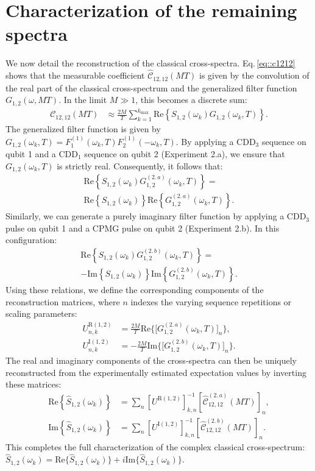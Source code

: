 \documentclass[%
 reprint,
superscriptaddress,
 amsmath,amssymb,
 aps,
pra,
]{revtex4-2}
\begin{document}
\section{Characterization of the remaining spectra}
\label{app::char}
We now detail the reconstruction of the classical cross-spectra. Eq.\,\eqref{eq::c1212} shows that the measurable coefficient $\hat{\mathcal{C}}_{12,12}(MT)$ is given by the convolution of the real part of the classical cross-spectrum and the generalized filter function $G_{1,2}(\omega, MT)$. In the limit $M\gg 1$, this becomes a discrete sum:
\begin{align}
    \mathcal{C}_{12,12}(MT)&\approx\frac{2M}{T}\sum_{k=1}^{k_{\max}}\text{Re}\left\{S_{1,2}(\omega_k)G_{1,2}(\omega_k, T)\right\}.
\end{align}
The generalized filter function is given by $G_{1,2}(\omega_k, T)=F_1^{(1)}(\omega_k, T)F_2^{(1)}(-\omega_k, T)$. By applying a $\text{CDD}_3$ sequence on qubit 1 and a $\text{CDD}_1$ sequence on qubit 2 (Experiment 2.a), we ensure that $G_{1,2}(\omega_k, T)$ is strictly real. Consequently, it follows that:
\begin{multline}
    \text{Re}\left\{S_{1,2}(\omega_k)G_{1,2}^{(2.\,a)}(\omega_k, T)\right\} = \\
    \text{Re}\left\{S_{1,2}(\omega_k)\right\}\text{Re}\left\{G_{1,2}^{(2.\,a)}(\omega_k, T)\right\}.
\end{multline}
Similarly, we can generate a purely imaginary filter function by applying a $\text{CDD}_3$ pulse on qubit 1 and a CPMG pulse on qubit 2 (Experiment 2.b). In this configuration:
\begin{multline}
    \text{Re}\left\{S_{1,2}(\omega_k)G_{1,2}^{(2.\,b)}(\omega_k, T)\right\} =\\
    -\text{Im}\left\{S_{1,2}(\omega_k)\right\}\text{Im}\left\{G_{1,2}^{(2.\,b)}(\omega_k, T)\right\}.
\end{multline}
Using these relations, we define the corresponding components of the reconstruction matrices, where $n$ indexes the varying sequence repetitions or scaling parameters:
\begin{align}
    U_{n,k}^{\text{R}(1,2)}&=\frac{2M}{T}\text{Re}\Big\{\big[G_{1,2}^{(2.\,a)}(\omega_k, T)\big]_n\Big\},\\
    U_{n,k}^{\text{I}(1,2)}&=-\frac{2M}{T}\text{Im}\Big\{\big[G_{1,2}^{(2.\,b)}(\omega_k, T)\big]_n\Big\}.
\end{align}
The real and imaginary components of the cross-spectra can then be uniquely reconstructed from the experimentally estimated expectation values by inverting these matrices:
\begin{align}
    \text{Re}\left\{\hat{S}_{1,2}(\omega_k)\right\} &= \sum_n\left[U^{\text{R}(1,2)}\right]^{-1}_{k,n}\left[\hat{\mathcal{C}}^{(2.\,a)}_{12,12}(MT)\right]_n,\\
    \text{Im}\left\{\hat{S}_{1,2}(\omega_k)\right\} &= \sum_n\left[U^{\text{I}(1,2)}\right]^{-1}_{k,n}\left[\hat{\mathcal{C}}^{(2.\,b)}_{12,12}(MT)\right]_n.
\end{align}
This completes the full characterization of the complex classical cross-spectrum: $\hat{S}_{1,2}(\omega_k)=\text{Re}\{\hat{S}_{1,2}(\omega_k)\}+i\text{Im}\{\hat{S}_{1,2}(\omega_k)\}$.
\end{document}
